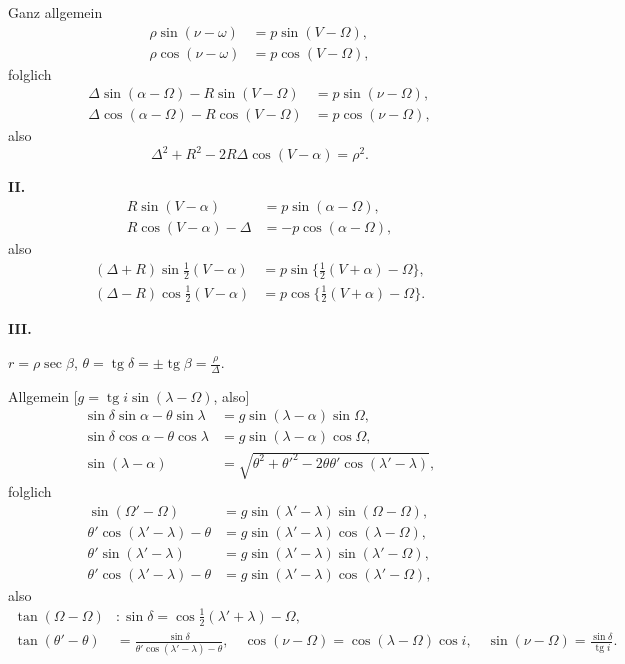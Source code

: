 \documentclass[12pt,a4paper]{article}
\DeclareMathOperator{\tg}{tg}
\theoremstyle{plain}
\theoremstyle{definition}
\theoremstyle{remark}
\begin{document}
Ganz allgemein
\begin{align*}
\rho \sin(\nu - \omega) &= p \sin(V - \Omega), \\
\rho \cos(\nu - \omega) &= p \cos(V - \Omega),
\end{align*}
folglich
\begin{align*}
\Delta \sin(\alpha - \Omega) - R \sin(V - \Omega) &= p \sin(\nu - \Omega), \\
\Delta \cos(\alpha - \Omega) - R \cos(V - \Omega) &= p \cos(\nu - \Omega),
\end{align*}
also
\[
\Delta^2 + R^2 - 2R\Delta \cos(V - \alpha) = \rho^2.
\]

\medskip

\textbf{II.}
\begin{align*}
R \sin(V - \alpha) &= p \sin(\alpha - \Omega), \\
R \cos(V - \alpha) - \Delta &= -p \cos(\alpha - \Omega),
\end{align*}
also
\begin{align*}
(\Delta + R) \sin\tfrac{1}{2}(V - \alpha) &= p \sin\{\tfrac{1}{2}(V + \alpha) - \Omega\}, \\
(\Delta - R) \cos\tfrac{1}{2}(V - \alpha) &= p \cos\{\tfrac{1}{2}(V + \alpha) - \Omega\}.
\end{align*}

\medskip

\noindent\textbf{III.}

$r = \rho \sec\beta$, $\theta = \tg\delta = \pm \tg\beta = \frac{\rho}{\Delta}$.

Allgemein [$g = \tg i \sin(\lambda - \Omega)$, also]
\begin{align*}
\sin\delta \sin\alpha - \theta \sin\lambda &= g \sin(\lambda - \alpha) \sin\Omega, \\
\sin\delta \cos\alpha - \theta \cos\lambda &= g \sin(\lambda - \alpha) \cos\Omega, \\
\sin(\lambda - \alpha) &= \sqrt{\theta^2 + \theta'^2 - 2\theta\theta' \cos(\lambda' - \lambda)},
\end{align*}
folglich
\begin{align*}
\sin(\Omega' - \Omega) &= g \sin(\lambda' - \lambda) \sin(\Omega - \Omega), \\
\theta' \cos(\lambda' - \lambda) - \theta &= g \sin(\lambda' - \lambda) \cos(\lambda - \Omega), \\
\theta' \sin(\lambda' - \lambda) &= g \sin(\lambda' - \lambda) \sin(\lambda' - \Omega), \\
\theta' \cos(\lambda' - \lambda) - \theta &= g \sin(\lambda' - \lambda) \cos(\lambda' - \Omega),
\end{align*}
also
\begin{align*}
\tan(\Omega - \Omega) &: \sin\delta = \cos\tfrac{1}{2}(\lambda' + \lambda) - \Omega, \\
\tan(\theta' - \theta) &= \frac{\sin\delta}{\theta' \cos(\lambda' - \lambda) - \theta}, \quad
\cos(\nu - \Omega) = \cos(\lambda - \Omega) \cos i, \quad
\sin(\nu - \Omega) = \frac{\sin\delta}{\tg i}.
\end{align*}
\end{document}
